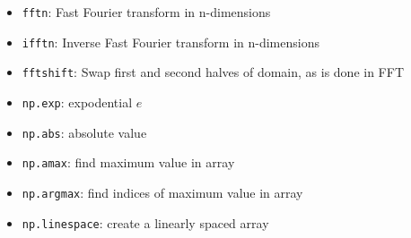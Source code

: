 \documentclass[11pt]{article}
\providecommand{\tightlist}{%
      \setlength{\itemsep}{0pt}\setlength{\parskip}{0pt}}
\begin{document}
\begin{itemize}
\tightlist
\item
  \texttt{fftn}: Fast Fourier transform in n-dimensions
\item
  \texttt{ifftn}: Inverse Fast Fourier transform in n-dimensions
\item
  \texttt{fftshift}: Swap first and second halves of domain, as is done
  in FFT
\item
  \texttt{np.exp}: expodential \(e\)
\item
  \texttt{np.abs}: absolute value
\item
  \texttt{np.amax}: find maximum value in array
\item
  \texttt{np.argmax}: find indices of maximum value in array
\item
  \texttt{np.linespace}: create a linearly spaced array
\end{itemize}


    
    
    
    
\end{document}
